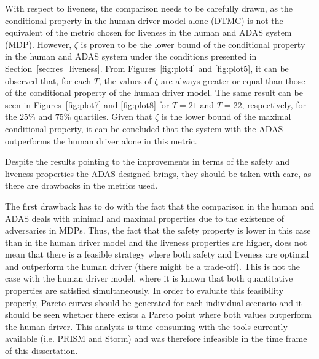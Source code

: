 With respect to liveness, the comparison needs to be carefully drawn, as the conditional property in the human driver model alone (DTMC) is not the equivalent of the metric chosen for liveness in the human and ADAS system (MDP). However, $\zeta$ is proven to be the lower bound of the conditional property in the human and ADAS system under the conditions presented in Section~\ref{sec:res_liveness}. From Figures~\ref{fig:plot4} and \ref{fig:plot5}, it can be observed that, for each $T$, the values of $\zeta$ are always greater or equal than those of the conditional property of the human driver model. The same result can be seen in Figures~\ref{fig:plot7} and \ref{fig:plot8} for $T=21$ and $T=22$, respectively, for the $25\%$ and $75\%$ quartiles. Given that $\zeta$ is the lower bound of the maximal conditional property, it can be concluded that the system with the ADAS outperforms the human driver alone in this metric. 

Despite the results pointing to the improvements in terms of the safety and liveness properties the ADAS designed brings, they should be taken with care, as there are drawbacks in the metrics used. 

The first drawback has to do with the fact that the comparison in the human and ADAS deals with minimal and maximal properties due to the existence of adversaries in MDPs. Thus, the fact that the safety property is lower in this case than in the human driver model and the liveness properties are higher, does not mean that there is a feasible strategy where both safety and liveness are optimal and outperform the human driver (there might be a trade-off). This is not the case with the human driver model, where it is known that both quantitative properties are satisfied simultaneously. In order to evaluate this feasibility properly, Pareto curves should be generated for each individual scenario and it should be seen whether there exists a Pareto point where both values outperform the human driver. This analysis is time consuming with the tools currently available (i.e. PRISM and Storm) and was therefore infeasible in the time frame of this dissertation. 

